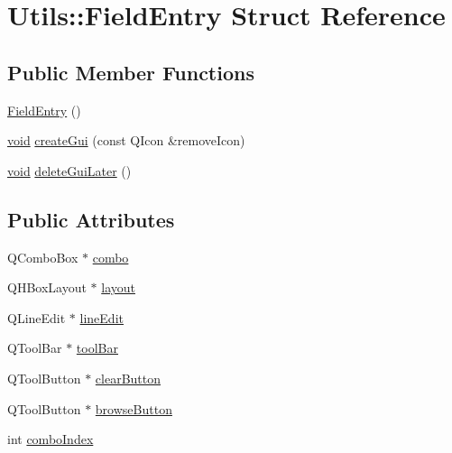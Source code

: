 \hypertarget{struct_utils_1_1_field_entry}{\section{\-Utils\-:\-:\-Field\-Entry \-Struct \-Reference}
\label{struct_utils_1_1_field_entry}
}
\subsection*{\-Public \-Member \-Functions}
\begin{DoxyCompactItemize}
\item 
\hyperlink{struct_utils_1_1_field_entry_a9cf330695d61003b321b9c01272220a5}{\-Field\-Entry} ()
\item 
\hyperlink{group___u_a_v_objects_plugin_ga444cf2ff3f0ecbe028adce838d373f5c}{void} \hyperlink{struct_utils_1_1_field_entry_ae95d71da6fc4ffffca5a9231a9dc4e79}{create\-Gui} (const \-Q\-Icon \&remove\-Icon)
\item 
\hyperlink{group___u_a_v_objects_plugin_ga444cf2ff3f0ecbe028adce838d373f5c}{void} \hyperlink{struct_utils_1_1_field_entry_ab813efd0b5a821f3226b0944f1ceaada}{delete\-Gui\-Later} ()
\end{DoxyCompactItemize}
\subsection*{\-Public \-Attributes}
\begin{DoxyCompactItemize}
\item 
\-Q\-Combo\-Box $\ast$ \hyperlink{struct_utils_1_1_field_entry_abd2511ae13715dedb73f5eacf4228cb2}{combo}
\item 
\-Q\-H\-Box\-Layout $\ast$ \hyperlink{struct_utils_1_1_field_entry_a1e7b88dcc6013fd6eebdea1d52a0192b}{layout}
\item 
\-Q\-Line\-Edit $\ast$ \hyperlink{struct_utils_1_1_field_entry_a5fb5e049e448a5e053854ee97ae92e01}{line\-Edit}
\item 
\-Q\-Tool\-Bar $\ast$ \hyperlink{struct_utils_1_1_field_entry_a87467dace17a68b94a3815c9cbdd4a8c}{tool\-Bar}
\item 
\-Q\-Tool\-Button $\ast$ \hyperlink{struct_utils_1_1_field_entry_a8926b09838e833b4547f3848df7a243b}{clear\-Button}
\item 
\-Q\-Tool\-Button $\ast$ \hyperlink{struct_utils_1_1_field_entry_a6183f102a26cf23b3789c436774bb487}{browse\-Button}
\item 
int \hyperlink{struct_utils_1_1_field_entry_a98cf51959e982fb59e83a1185d5f382b}{combo\-Index}
\end{DoxyCompactItemize}


